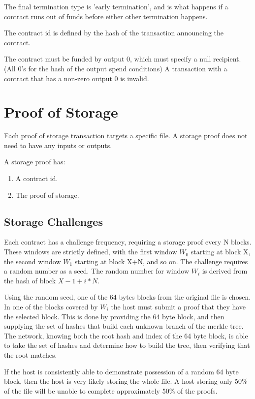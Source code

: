 \documentclass[twocolumn]{article}
\begin{document}
The final termination type is 'early termination', and is what happens if a contract runs out of funds before either other termination happens.

The contract id is defined by the hash of the transaction announcing the contract.

The contract must be funded by output 0, which must specify a null recipient. (All 0's for the hash of the output spend conditions)
A transaction with a contract that has a non-zero output 0 is invalid.

\section{Proof of Storage}
Each proof of storage transaction targets a specific file.
A storage proof does not need to have any inputs or outputs.

A storage proof has:
\begin{enumerate}
	\item A contract id.
	\item The proof of storage.
\end{enumerate}

\subsection{Storage Challenges}
Each contract has a challenge frequency, requiring a storage proof every N blocks.
These windows are strictly defined, with the first window $W_0$ starting at block X, the second window $W_1$ starting at block X+N, and so on.
The challenge requires a random number as a seed.
The random number for window $W_i$ is derived from the hash of block $X-1 + i*N$.

Using the random seed, one of the 64 bytes blocks from the original file is chosen.
In one of the blocks covered by $W_i$ the host must submit a proof that they have the selected block.
This is done by providing the 64 byte block, and then supplying the set of hashes that build each unknown branch of the merkle tree.
The network, knowing both the root hash and index of the 64 byte block, is able to take the set of hashes and determine how to build the tree, then verifying that the root matches.

If the host is consistently able to demonstrate possession of a random 64 byte block, then the host is very likely storing the whole file.
A host storing only 50\% of the file will be unable to complete approximately 50\% of the proofs.
\end{document}
